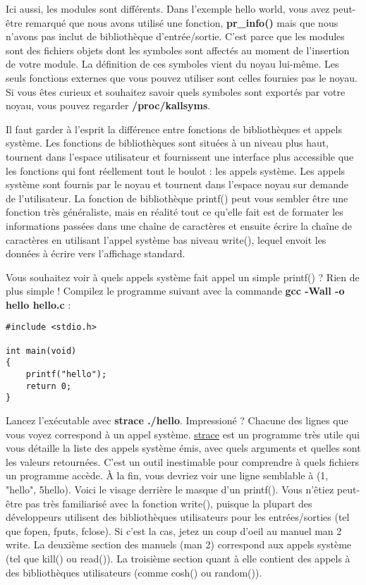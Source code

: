 \documentclass[11pt]{article}
\begin{document}
Ici aussi, les modules sont différents. Dans l'exemple hello world, vous avez peut-être remarqué que nous avons utilisé une fonction, \textbf{pr\_info()} mais que nous n'avons pas inclut de bibliothèque d'entrée/sortie. C'est parce que les modules sont des fichiers objets dont les symboles sont affectés au moment de l'insertion de votre module. La définition de ces symboles vient du noyau lui-même. Les seuls fonctions externes que vous pouvez utiliser sont celles fournies pas le noyau. Si vous êtes curieux et souhaitez savoir quels symboles sont exportés par votre noyau, vous pouvez regarder \textbf{/proc/kallsyms}.

Il faut garder à l'esprit la différence entre fonctions de bibliothèques et appels système. Les fonctions de bibliothèques sont situées à un niveau plus haut, tournent dans l'espace utilisateur et fournissent une interface plus accessible que les fonctions qui font réellement tout le boulot : les appels système. Les appels système sont fournis par le noyau et tournent dans l'espace noyau sur demande de l'utilisateur. La fonction de bibliothèque printf() peut vous sembler être une fonction très généraliste, mais en réalité tout ce qu'elle fait est de formater les informations passées dans une chaîne de caractères et ensuite écrire la chaîne de caractères en utilisant l'appel système bas niveau write(), lequel envoit les données à écrire vers l'affichage standard.

Vous souhaitez voir à quels appels système fait appel un simple printf() ? Rien de plus simple ! Compilez le programme suivant avec la commande \textbf{gcc -Wall -o hello hello.c} :

\begin{verbatim}
#include <stdio.h>

int main(void)
{
    printf("hello");
    return 0;
}
\end{verbatim}

Lancez l'exécutable avec \textbf{strace ./hello}. Impressioné ? Chacune des lignes que vous voyez correspond à un appel système. \href{https://strace.io/}{strace} est un programme très utile qui vous détaille la liste des appels système émis, avec quels arguments et quelles sont les valeurs retournées. C'est un outil inestimable pour comprendre à quels fichiers un programme accède. À la fin, vous devriez voir une ligne semblable à (1, "hello", 5hello). Voici le visage derrière le masque d'un printf(). Vous n'êtiez peut-être pas très familiarisé avec la fonction write(), puisque la plupart des développeurs utilisent des bibliothèques utilisateurs pour les entrées/sorties (tel que fopen, fputs, fclose). Si c'est la cas, jetez un coup d'oeil au manuel man 2 write. La deuxième section des manuels (man 2) correspond aux appels système (tel que kill() ou read()). La troisième section quant à elle contient des appels à des bibliothèques utilisateurs (comme cosh() ou random()).
\end{document}
